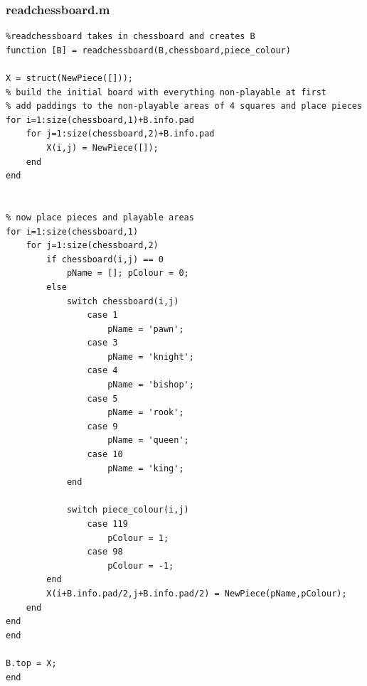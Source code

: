 \documentclass[11pt,a4paper]{article}
\begin{document}
\subsubsection{readchessboard.m}
\begin{lstlisting}
%readchessboard takes in chessboard and creates B
function [B] = readchessboard(B,chessboard,piece_colour)

X = struct(NewPiece([]));
% build the initial board with everything non-playable at first
% add paddings to the non-playable areas of 4 squares and place pieces
for i=1:size(chessboard,1)+B.info.pad
    for j=1:size(chessboard,2)+B.info.pad
        X(i,j) = NewPiece([]);
    end
end


% now place pieces and playable areas
for i=1:size(chessboard,1)
    for j=1:size(chessboard,2)
        if chessboard(i,j) == 0
            pName = []; pColour = 0;
        else
            switch chessboard(i,j)
                case 1
                    pName = 'pawn';
                case 3
                    pName = 'knight';
                case 4
                    pName = 'bishop';
                case 5
                    pName = 'rook';
                case 9
                    pName = 'queen';
                case 10
                    pName = 'king';
            end
            
            switch piece_colour(i,j)
                case 119
                    pColour = 1;
                case 98
                    pColour = -1;
        end
        X(i+B.info.pad/2,j+B.info.pad/2) = NewPiece(pName,pColour);
    end
end
end

B.top = X;
end
\end{lstlisting}
\end{document}
